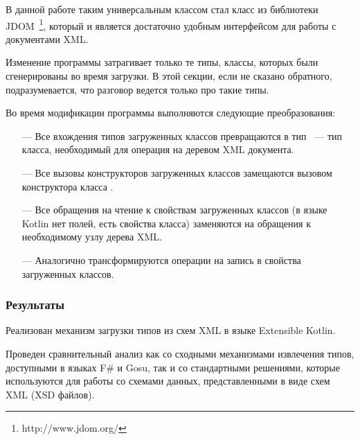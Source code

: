 В данной работе таким универсальным классом стал класс  из библиотеки JDOM~\footnote{http://www.jdom.org/}, который и является достаточно удобным интерфейсом для работы с документами XML.

Изменение программы затрагивает только те типы, классы, которых были сгенерированы во время загрузки. В этой секции, если не сказано обратного, подразумевается, что разговор ведется только про такие типы.

Во время модификации программы выполняются следующие преобразования:
\begin{itemize}
\item[---] Все вхождения типов загруженных классов превращаются в тип ~--- тип класса, необходимый для операция на деревом XML документа.
\item[---] Все вызовы конструкторов загруженных классов замещаются вызовом конструктора класса .
\item[---] Все обращения на чтение к свойствам загруженных классов (в языке Kotlin нет полей, есть свойства класса) заменяются на обращения к необходимому узлу дерева XML.
\item[---] Аналогично трансформируются операции на запись в свойства загруженных классов.
\end{itemize}

\subsubsection{Результаты}
Реализован механизм загрузки типов из схем XML в языке Extensible Kotlin.

Проведен сравнительный анализ как со сходными механизмами извлечения типов, доступными в языках F\# и Gosu, так и со стандартными решениями, которые используются для работы со схемами данных, представленными в виде схем XML (XSD файлов).